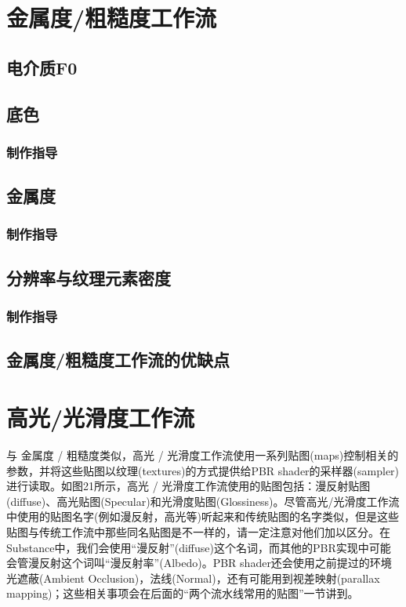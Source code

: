 \section{金属度/粗糙度工作流}

\subsection{电介质F0}

\subsection{底色}

\subsubsection{制作指导}

\subsection{金属度}

\subsubsection{制作指导}

\subsection{分辨率与纹理元素密度}

\subsubsection{制作指导}

\subsection{金属度/粗糙度工作流的优缺点}

\section{高光/光滑度工作流}

与 金属度 / 粗糙度类似，高光 / 光滑度工作流使用一系列贴图(maps)控制相关的参数，并将这些贴图以纹理(textures)的方式提供给PBR shader的采样器(sampler)进行读取。如图21所示，高光 / 光滑度工作流使用的贴图包括：漫反射贴图(diffuse)、高光贴图(Specular)和光滑度贴图(Glossiness)。尽管高光/光滑度工作流中使用的贴图名字(例如漫反射，高光等)听起来和传统贴图的名字类似，但是这些贴图与传统工作流中那些同名贴图是不一样的，请一定注意对他们加以区分。在Substance中，我们会使用“漫反射”(diffuse)这个名词，而其他的PBR实现中可能会管漫反射这个词叫“漫反射率”(Albedo)。PBR shader还会使用之前提过的环境光遮蔽(Ambient Occlusion)，法线(Normal)，还有可能用到视差映射(parallax mapping)；这些相关事项会在后面的“两个流水线常用的贴图”一节讲到。

